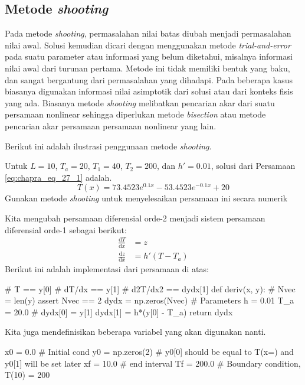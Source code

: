 \subsection{Metode \textit{shooting}}

Pada metode \textit{shooting}, permasalahan nilai batas diubah menjadi permasalahan
nilai awal. Solusi kemudian dicari dengan menggunakan metode \textit{trial-and-error}
pada suatu parameter atau informasi yang belum diketahui, misalnya informasi nilai
awal dari turunan pertama. Metode ini tidak memiliki bentuk yang baku, dan sangat
bergantung dari permasalahan yang dihadapi. Pada beberapa kasus biasanya digunakan
informasi nilai asimptotik dari solusi atau dari konteks fisis yang ada. 
Biasanya metode \textit{shooting} melibatkan pencarian akar dari suatu persamaan
nonlinear sehingga diperlukan metode \textit{bisection} atau metode pencarian akar persamaan
persamaan nonlinear yang lain.

Berikut ini adalah ilustrasi penggunaan metode \textit{shooting}.
\begin{soal}
Untuk $L=10$, $T_a = 20$, $T_1 = 40$, $T_2 = 200$, dan $h' = 0.01$, solusi
dari Persamaan \eqref{eq:chapra_eq_27_1} adalah.
\begin{equation*}
T(x) = 73.4523 e^{0.1x} - 53.4523 e^{-0.1x} + 20
\end{equation*}
Gunakan metode \textit{shooting} untuk menyelesaikan persamaan ini secara numerik
\end{soal}


Kita mengubah persamaan diferensial orde-2 menjadi sistem persamaan diferensial
orde-1 sebagai berikut:
\begin{align*}
\frac{\mathrm{d}T}{\mathrm{d}x} & = z \\
\frac{\mathrm{d}z}{\mathrm{d}x} & = h'(T - T_a)
\end{align*}
Berikut ini adalah implementasi dari persamaan di atas:
\begin{pythoncode}
# T == y[0]
# dT/dx == y[1]
# d2T/dx2 == dydx[1]
def deriv(x, y):
    #
    Nvec = len(y)
    assert Nvec == 2
    dydx = np.zeros(Nvec)
    # Parameters
    h = 0.01
    T_a = 20.0
    #
    dydx[0] = y[1]
    dydx[1] = h*(y[0] - T_a)
    return dydx
\end{pythoncode}

Kita juga mendefinisikan beberapa variabel yang akan digunakan nanti.
\begin{pythoncode}
x0 = 0.0 # Initial cond
y0 = np.zeros(2) # y0[0] should be equal to T(x=) and y0[1] will be set later
xf = 10.0  # end interval
Tf = 200.0 # Boundary condition, T(10) = 200
\end{pythoncode}


